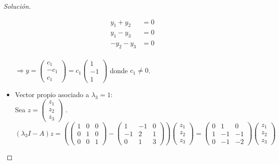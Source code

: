 \documentclass[12pt]{book}
\newenvironment{solucion}
  {\renewcommand\qedsymbol{$\square$}\begin{proof}[Solución]}
  {\end{proof}}
\begin{document}
\begin{solucion}
\begin{itemize}
        \begin{align*}
            y_1+y_2&=0\\
            y_1-y_3&=0\\
            -y_2-y_3&=0
        \end{align*}
        \\
        $\Rightarrow y= \begin{pmatrix}
        c_1\\
        -c_1\\
        c_1
        \end{pmatrix} = c_1\begin{pmatrix}
        1\\
        -1\\
        1
        \end{pmatrix}$ donde $c_1 \neq 0$.\\
    \item Vector propio asociado a $\lambda_3=1$:\\
        Sea $z=\begin{pmatrix}
        z_1\\
        z_2\\
        z_3
        \end{pmatrix}$ .\\
        $(\lambda_3I-A)z=\left(\begin{pmatrix}
        1 & 0 & 0\\
        0 & 1 & 0\\
        0 & 0 & 1
        \end{pmatrix} - \begin{pmatrix}
        1 & -1 & 0\\
        -1 & 2 & 1\\
        0 & 1 & 3
        \end{pmatrix}\right)\begin{pmatrix}
        z_1\\
        z_2\\
        z_3
        \end{pmatrix}=\begin{pmatrix}
        0 & 1 & 0\\
        1 & -1 & -1\\
        0 & -1 & -2
        \end{pmatrix}\begin{pmatrix}
        z_1\\
        z_2\\
        z_3
        \end{pmatrix}$\\

\end{itemize}
\end{solucion}
\end{document}
